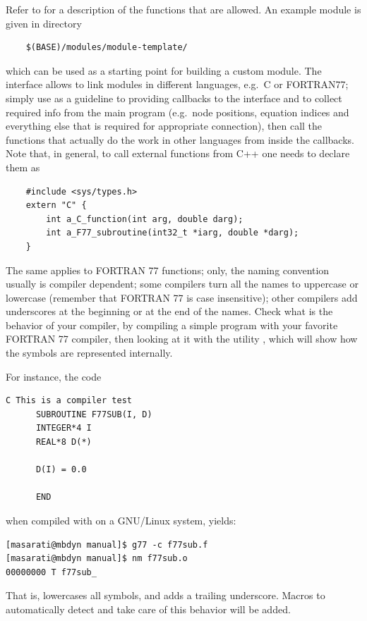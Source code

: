 \noindent
Refer to  for a description of the
functions that are allowed.
An example module is given in directory
\begin{verbatim}
    $(BASE)/modules/module-template/
\end{verbatim}
which can be used as a starting point for building a custom module.
The  interface allows to link modules in different
languages, e.g.\ C or FORTRAN77; simply use 
as a guideline to providing callbacks to the 
interface and to collect required info from the main program
(e.g.\ node positions, equation indices and everything else that is
required for appropriate connection), then call the functions that
actually do the work in other languages from inside the callbacks.
Note that, in general, to call external functions from C++ one needs
to declare them as
\begin{verbatim}
    #include <sys/types.h>
    extern "C" {
        int a_C_function(int arg, double darg);
        int a_F77_subroutine(int32_t *iarg, double *darg);
    }
\end{verbatim}
The same applies to FORTRAN 77 functions; only, the naming convention
usually is compiler dependent; some compilers turn all the names to 
uppercase or lowercase (remember that FORTRAN 77 is case insensitive);
other compilers add underscores at the beginning or at the end of the
names.
Check what is the behavior of your compiler, by compiling a simple 
program with your favorite FORTRAN 77 compiler, then looking at it
with the utility , which will show how the symbols are represented 
internally.

\noindent
For instance, the code
\begin{verbatim}
C This is a compiler test
      SUBROUTINE F77SUB(I, D)
      INTEGER*4 I
      REAL*8 D(*)

      D(I) = 0.0

      END
\end{verbatim}
when compiled with  on a GNU/Linux system, yields:
\begin{verbatim}
[masarati@mbdyn manual]$ g77 -c f77sub.f
[masarati@mbdyn manual]$ nm f77sub.o
00000000 T f77sub_
\end{verbatim}
That is,  lowercases all symbols, and adds a trailing 
underscore.
Macros to automatically detect and take care of this behavior 
will be added.


